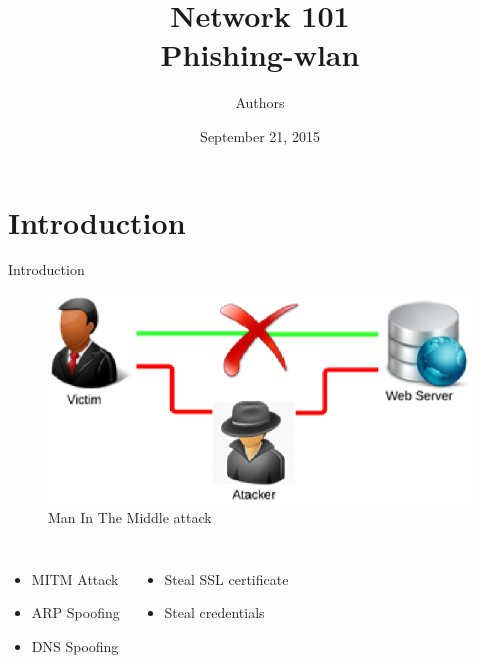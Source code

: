 \documentclass{beamer}
\title[Phishing-Wlan]{Network 101\\Phishing-wlan}
\author{Authors}
\institute{Institute}
\date{September 21, 2015}
\begin{document}
\begin{frame}
	\titlepage
\end{frame}


\section{Introduction}
\begin{frame}{Introduction}
	\begin{figure}[!h]
		\centering
		\includegraphics[scale=0.5]{../images/mitm.eps}
		\caption{Man In The Middle attack}
		\label{mitm_attack}
	\end{figure}

    \begin{columns}
		\begin{itemize}
			\item MITM Attack\\
			\item ARP Spoofing\\
			\item DNS Spoofing\\
		\end{itemize}
		\begin{itemize}
			\item Steal SSL certificate\\
			\item Steal credentials\\
		\end{itemize}
	\end{columns}
\end{frame}
\end{document}
